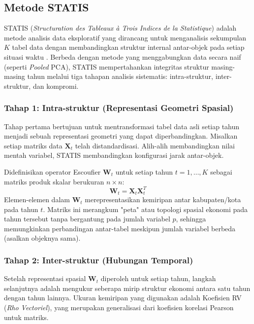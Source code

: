 \documentclass[a4paper]{article}
\theoremstyle{definition} %
\begin{document}
\subsection{Metode STATIS}

STATIS (\textit{Structuration des Tableaux à Trois Indices de la Statistique}) adalah metode analisis data eksploratif yang dirancang untuk menganalisis sekumpulan $K$ tabel data dengan membandingkan struktur internal antar-objek pada setiap situasi waktu \citep{lavit94}. Berbeda dengan metode yang menggabungkan data secara naif (seperti \textit{Pooled} PCA), STATIS mempertahankan integritas struktur masing-masing tahun melalui tiga tahapan analisis sistematis: intra-struktur, inter-struktur, dan kompromi.

\subsubsection{Tahap 1: Intra-struktur (Representasi Geometri Spasial)}
Tahap pertama bertujuan untuk mentransformasi tabel data asli setiap tahun menjadi sebuah representasi geometri yang dapat diperbandingkan. Misalkan setiap matriks data $\mathbf{X}_t$ telah distandardisasi. Alih-alih membandingkan nilai mentah variabel, STATIS membandingkan konfigurasi jarak antar-objek.

Didefinisikan operator Escoufier $\mathbf{W}_t$ untuk setiap tahun $t=1, \dots, K$ sebagai matriks produk skalar berukuran $n \times n$:
\begin{equation}
	\mathbf{W}_t = \mathbf{X}_t \mathbf{X}_t^T
\end{equation}
Elemen-elemen dalam $\mathbf{W}_t$ merepresentasikan kemiripan antar kabupaten/kota pada tahun $t$. Matriks ini merangkum "peta" atau topologi spasial ekonomi pada tahun tersebut tanpa bergantung pada jumlah variabel $p$, sehingga memungkinkan perbandingan antar-tabel meskipun jumlah variabel berbeda (asalkan objeknya sama).

\subsubsection{Tahap 2: Inter-struktur (Hubungan Temporal)}
Setelah representasi spasial $\mathbf{W}_t$ diperoleh untuk setiap tahun, langkah selanjutnya adalah mengukur seberapa mirip struktur ekonomi antara satu tahun dengan tahun lainnya. Ukuran kemiripan yang digunakan adalah Koefisien RV (\textit{Rho Vectoriel}), yang merupakan generalisasi dari koefisien korelasi Pearson untuk matriks.
\end{document}
